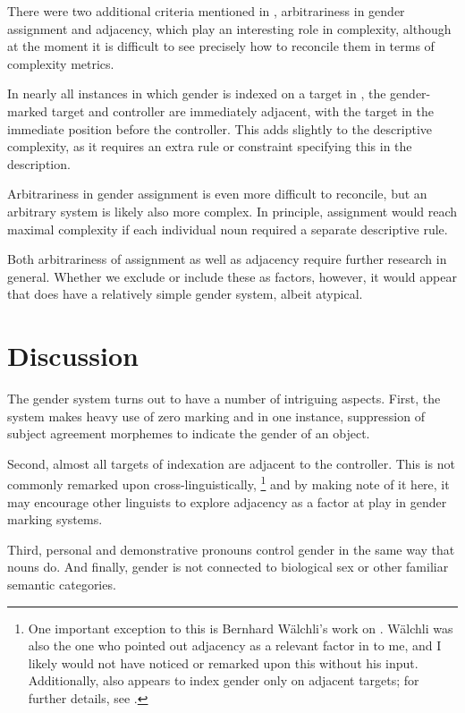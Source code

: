 \documentclass[output=collectionpaper,hidelinks]{langscibook}
\theoremstyle{remark}
\begin{document}
There were two additional criteria mentioned in ,
arbitrariness in gender assignment and adjacency, which play an interesting role
in complexity, although at the moment it is difficult to see precisely how to
reconcile them in terms of complexity metrics.

In nearly all instances in which gender is indexed on a target in , the
gender-marked target and controller are immediately adjacent, with the target in
the immediate position before the controller.  This adds slightly to the
descriptive complexity, as it requires an extra rule or constraint specifying
this in the description.

Arbitrariness in gender assignment is even more difficult to reconcile, but an
arbitrary system is likely also more complex.  In principle, assignment would
reach maximal complexity if each individual noun required a separate descriptive
rule.

Both arbitrariness of assignment as well as adjacency require further research
in general.  Whether we exclude or include these as factors, however, it would
appear that  does have a relatively simple gender system, albeit atypical.

\section{Discussion}
\label{sec:Discussion}

The  gender system turns out to have a number of intriguing aspects.
First, the system makes heavy use of zero marking and in one instance,
suppression of subject agreement morphemes to indicate the gender of an object.

\newpage 
Second, almost all targets of indexation are adjacent to the controller. This
is not commonly remarked upon cross-linguistically,%
\footnote{One important exception to this is Bernhard Wälchli's work on 
\citep{Waelchli2018}.  Wälchli was also the one who pointed out
adjacency as a relevant factor in  to me, and I likely would not have
noticed or remarked upon this without his input.  Additionally,  also
appears to index gender only on adjacent targets; for further details, see
\citet{Gueldemann2006}.} %
and by making note of it here, it may encourage other linguists to explore
adjacency as a factor at play in gender marking systems.

Third, personal and demonstrative pronouns control gender in the same way that
nouns do.  And finally, gender is not connected to biological sex or other
familiar semantic categories.
\end{document}
